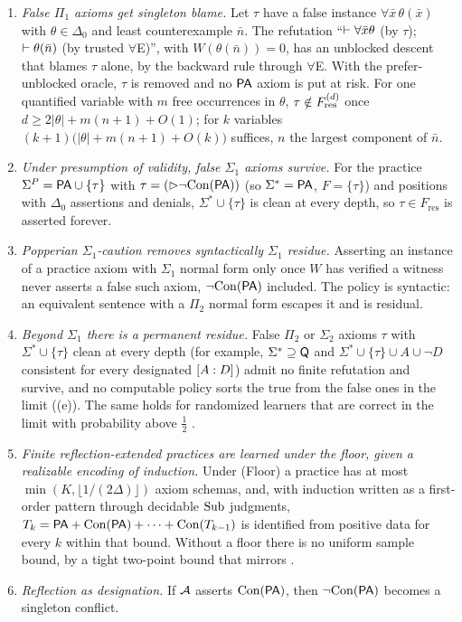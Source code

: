 \begin{theorem}\label{thm:twotier:arith}
\leavevmode
\begin{enumerate}[label=(\alph*),leftmargin=*]
\item \emph{False $\Pi_1$ axioms get singleton blame.} Let $\tau$ have a false instance $\forall\bar x\,\theta(\bar x)$ with $\theta\in\Delta_0$ and least counterexample $\bar n$. The refutation ``$\vdash\forall\bar x\theta$ (by $\tau$); $\vdash\theta(\bar n)$ (by trusted $\forall$E)'', with $W(\theta(\bar n))=0$, has an unblocked descent that blames $\tau$ alone, by the backward rule through $\forall$E. With the prefer-unblocked oracle, $\tau$ is removed and no $\mathsf{PA}$ axiom is put at risk. For one quantified variable with $m$ free occurrences in $\theta$, $\tau\notin F^{(d)}_{\mathrm{res}}$ once $d\ge2|\theta|+m(n+1)+O(1)$; for $k$ variables $(k+1)\bigl(|\theta|+m(n+1)+O(k)\bigr)$ suffices, $n$ the largest component of $\bar n$.
\item \emph{Under presumption of validity, false $\Sigma_1$ axioms survive.} For the practice $\Sigma^P=\mathsf{PA}\cup\{\tau\}$ with $\tau=(\rhd\neg\mathrm{Con}(\mathsf{PA}))$ (so $\Sigma^*=\mathsf{PA}$, $F=\{\tau\}$) and positions with $\Delta_0$ assertions and denials, $\Sigma^*\cup\{\tau\}$ is clean at every depth, so $\tau\in F_{\mathrm{res}}$ is asserted forever.
\item \emph{Popperian $\Sigma_1$-caution removes syntactically $\Sigma_1$ residue.} Asserting an instance of a practice axiom with $\Sigma_1$ normal form only once $W$ has verified a witness never asserts a false such axiom, $\neg\mathrm{Con}(\mathsf{PA})$ included. The policy is syntactic: an equivalent sentence with a $\Pi_2$ normal form escapes it and is residual.
\item \emph{Beyond $\Sigma_1$ there is a permanent residue.} False $\Pi_2$ or $\Sigma_2$ axioms $\tau$ with $\Sigma^*\cup\{\tau\}$ clean at every depth (for example, $\Sigma^*\supseteq\mathsf{Q}$ and $\Sigma^*\cup\{\tau\}\cup A\cup\neg D$ consistent for every designated $[A : D]$) admit no finite refutation and survive, and no computable policy sorts the true from the false ones in the limit ((e)). The same holds for randomized learners that are correct in the limit with probability above $\frac12$ .
\item \emph{Finite reflection-extended practices are learned under the floor, given a realizable encoding of induction.} Under (Floor) a practice has at most $\min(K,\lfloor1/(2\Delta)\rfloor)$ axiom schemas, and, with induction written as a first-order pattern through decidable $\mathrm{Sub}$ judgments, $T_k=\mathsf{PA}+\mathrm{Con}(\mathsf{PA})+\dots+\mathrm{Con}(T_{k-1})$ is identified from positive data for every $k$ within that bound. Without a floor there is no uniform sample bound, by a tight two-point bound that mirrors .
\item \emph{Reflection as designation.} If $\mathcal{A}$ asserts $\mathrm{Con}(\mathsf{PA})$, then $\neg\mathrm{Con}(\mathsf{PA})$ becomes a singleton conflict.
\end{enumerate}
\end{theorem}


